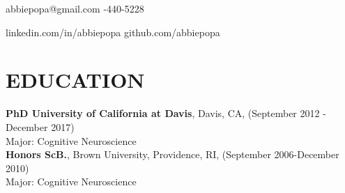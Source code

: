 \documentclass[line,margin,10pt]{res}
\begin{document}
 
\begin{resume}
\hoffset\centerline 
{abbiepopa@gmail.com    \quad \quad \quad \quad \quad \quad  \quad \quad \quad \quad \quad \quad \quad \quad \quad \quad \quad \quad \quad \quad \quad\quad \quad \quad \quad \quad \quad \quad \quad \quad \quad \quad  \quad \quad {}-440-5228}
\hoffset\centerline 
{\hspace{0.05cm} linkedin.com/in/abbiepopa \quad \quad \quad \quad \quad \quad \quad \quad \quad \quad \quad\quad \quad \quad \quad \quad \quad \quad \quad \quad \quad \quad  \quad \quad \quad  \quad \quad \quad   \quad github.com/abbiepopa}
 
\section{EDUCATION} 
\textbf{PhD University of California at Davis}, Davis, CA, (September 2012 - December 2017)\\
Major: Cognitive Neuroscience\\
\textbf{Honors ScB.}, Brown University, Providence, RI, (September 2006-December 2010)\\
                Major: Cognitive Neuroscience
								


\end{resume}
\end{document}
